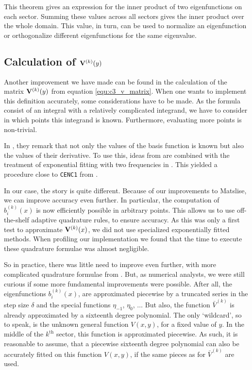 This theorem gives an expression for the inner product of two eigenfunctions on each sector. Summing these values across all sectors gives the inner product over the whole domain. This value, in turn, can be used to normalize an eigenfunction or orthogonalize different eigenfunctions for the same eigenvalue.

\subsection{Calculation of \texorpdfstring{$\vb{V}^{(k)}(y)$}{Vk(y)}}\label{sec:c3_calculate_vk}

Another improvement we have made can be found in the calculation of the matrix $\vb{V}^{(k)}(y)$ from equation \eqref{equ:c3_v_matrix}. When one wants to implement this definition accurately, some considerations have to be made. As the formula consist of an integral with a relatively complicated integrand, we have to consider in which points this integrand is known. Furthermore, evaluating more points is non-trivial.

In \cite{ixaru_new_2010}, they remark that not only the values of the basis function is known but also the values of their derivative. To use this, ideas from \cite{kim_quadrature_2002} are combined with the treatment of exponential fitting with two frequencies in \cite{ixaru_operations_1997}. This yielded a procedure close to \texttt{CENC1} from \cite{ixaru_exponential_2004}.

In our case, the story is quite different. Because of our improvements to Matslise, we can improve accuracy even further. In particular, the computation of $b_i^{(k)}(x)$ is now efficiently possible in arbitrary points. This allows us to use off-the-shelf adaptive quadrature rules, to ensure accuracy. As this was only a first test to approximate $\vb{V}^{(k)}(x)$, we did not use specialized exponentially fitted methods. When profiling our implementation we found that the time to execute these quadrature formulae was almost negligible.

So in practice, there was little need to improve even further, with more complicated quadrature formulae from \cite{ixaru_operations_1997,kim_quadrature_2002,conte_modified_2016}. But, as numerical analysts, we were still curious if some more fundamental improvements were possible. After all, the eigenfunctions $b_i^{(k)}(x)$, are approximated piecewise by a truncated series in the step size $\delta$ and the special functions $\eta_{-1}$, $\eta_{0}$, $\dots$ But also, the function $\bar{V}^{(k)}$ is already approximated by a sixteenth degree polynomial. The only `wildcard', so to speak, is the unknown general function $V(x, y)$, for a fixed value of $y$. In the middle of the $k^\text{th}$ sector, this function is approximated piecewise. As such, it is reasonable to assume, that a piecewise sixteenth degree polynomial can also be accurately fitted on this function $V(x, y)$, if the same pieces as for $\bar{V}^{(k)}$ are used.


